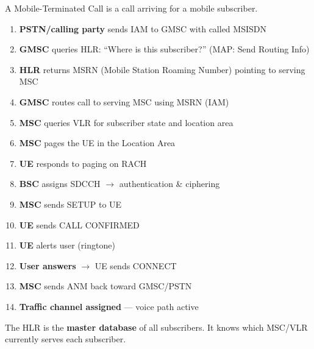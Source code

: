 A Mobile-Terminated Call is a call arriving for a mobile subscriber.


\begin{enumerate}
\def\labelenumi{\arabic{enumi}.}
\tightlist
\item
  \textbf{PSTN/\allowbreak{}calling party} sends IAM to GMSC with called MSISDN
\item
  \textbf{GMSC} queries HLR: ``Where is this subscriber?'' (MAP: Send Routing Info)
\item
  \textbf{HLR} returns MSRN (Mobile Station Roaming Number) pointing to serving MSC
\item
  \textbf{GMSC} routes call to serving MSC using MSRN (IAM)
\item
  \textbf{MSC} queries VLR for subscriber state and location area
\item
  \textbf{MSC} pages the UE in the Location Area
\item
  \textbf{UE} responds to paging on RACH
\item
  \textbf{BSC} assigns SDCCH \ensuremath{\to} authentication \& ciphering
\item
  \textbf{MSC} sends SETUP to UE
\item
  \textbf{UE} sends CALL CONFIRMED
\item
  \textbf{UE} alerts user (ringtone)
\item
  \textbf{User answers} \ensuremath{\to} UE sends CONNECT
\item
  \textbf{MSC} sends ANM back toward GMSC/\allowbreak{}PSTN
\item
  \textbf{Traffic channel assigned} — voice path active
\end{enumerate}







\CNchained{}

The HLR is the \textbf{master database} of all subscribers. It knows which MSC/\allowbreak{}VLR currently serves each subscriber.

